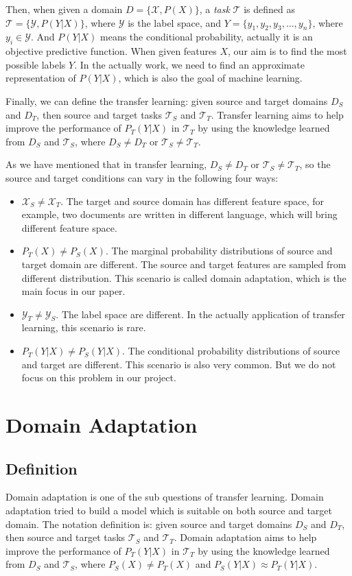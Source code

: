 \documentclass{kththesis}
\begin{document}
\noindent Then, when given a domain $D = \{\mathcal{X}, P(X)\}$, a \emph{task} $\mathcal{T}$ is defined as $\mathcal{T} = \{\mathcal{Y},P(Y|X)\}$, where $\mathcal{Y}$ is the label space, and $Y = \{y_1,y_2,y_3,...,y_n\}$, where $y_i \in \mathcal{Y}$. And $P(Y|X)$ means the conditional probability, actually it is an objective predictive function. When given features $X$, our aim is to find the most possible labels $Y$. In the actually work, we need to find an approximate representation of $P(Y|X)$, which is also the goal of machine learning.

\noindent Finally, we can define the transfer learning: given source and target domains $D_S$ and $D_T$, then source and target tasks $\mathcal{T}_S$ and $\mathcal{T}_T$. Transfer learning aims to help improve the performance of $P_T(Y|X)$ in $\mathcal{T}_T$ by using the knowledge learned from $D_S$ and $\mathcal{T}_S$, where $D_S \neq D_T$ or $\mathcal{T}_S \neq \mathcal{T}_T$.

\noindent As we have mentioned that in transfer learning, $D_S \neq D_T$ or $\mathcal{T}_S \neq \mathcal{T}_T$, so the source and target conditions can vary in the following four ways:
\begin{itemize}
    \item $\mathcal{X}_S \neq \mathcal{X}_T$. The target and source domain has different feature space, for example, two documents are written in different language, which will bring different feature space. 
    \item $P_T(X) \neq P_S(X)$. The marginal probability distributions of source and target domain are different. The source and target features are sampled from different distribution. This scenario is called domain adaptation, which is the main focus in our paper. 
    \item $\mathcal{Y}_T \neq \mathcal{Y}_S$. The label space are different. In the actually application of transfer learning, this scenario is rare. 
    \item $P_T(Y|X) \neq P_S(Y|X)$. The conditional probability distributions of source and target are different. This scenario is also very common. But we do not focus on this problem in our project.
\end{itemize}

\section{Domain Adaptation}
\subsection{Definition}
Domain adaptation is one of the sub questions of transfer learning. Domain adaptation tried to build a model which is suitable on both source and target domain. The notation definition is:  given source and target domains $D_S$ and $D_T$, then source and target tasks $\mathcal{T}_S$ and $\mathcal{T}_T$. Domain adaptation aims to help improve the performance of $P_T(Y|X)$ in $\mathcal{T}_T$ by using the knowledge learned from $D_S$ and $\mathcal{T}_S$, where $P_S(X) \neq P_T(X)$ and $P_S(Y|X) \approx P_T(Y|X)$.
\end{document}
